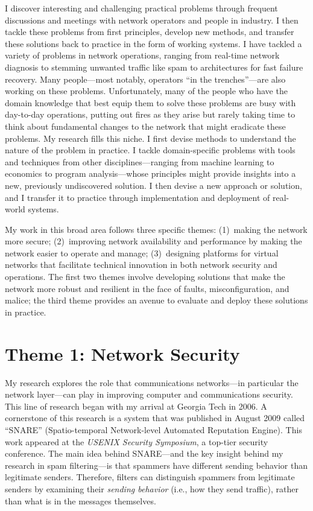 I discover interesting and challenging practical problems through
frequent discussions and meetings with network operators and people in
industry.  I then tackle these problems from first principles, develop
new methods, and transfer these solutions back to practice in the form
of working systems.  I have tackled a variety of problems in network
operations, ranging from real-time network diagnosis to stemming
unwanted traffic like spam to architectures for fast failure recovery.
Many people---most notably, operators ``in the trenches''---are also
working on these problems.  Unfortunately, many of the people who have
the domain knowledge that best equip them to solve these problems are
busy with day-to-day operations, putting out fires as they arise but
rarely taking time to think about fundamental changes to the network
that might eradicate these problems.  My research fills this niche.  I
first devise methods to understand the nature of the problem in
practice.  I tackle domain-specific problems with tools and techniques
from other disciplines---ranging from machine learning to economics to
program analysis---whose principles might provide insights into a new,
previously undiscovered solution.  I then devise a new approach or
solution, and I transfer it to practice through implementation and
deployment of real-world systems.

My work in this broad area follows three specific themes: (1)~making the
network more secure; (2)~improving network availability and performance
by making the network easier to operate and manage; (3)~designing
platforms for virtual networks that facilitate technical innovation in
both network security and operations.  The first two themes involve
developing solutions that make the network more robust and resilient in
the face of faults, misconfiguration, and malice; the third theme
provides an avenue to evaluate and deploy these solutions in practice.

\section*{Theme 1: Network Security}

  My research explores the role that communications
networks---in particular the network layer---can play in improving
computer and communications security.  This line of research began with
my arrival at Georgia Tech in 2006. A cornerstone of this
research is a system that was published in August 2009 called ``SNARE''
(Spatio-temporal Network-level Automated Reputation Engine). This work
appeared at the {\em USENIX Security Symposium}, a top-tier security
conference. The main idea behind SNARE---and the key insight behind my
research in spam filtering---is that spammers have different sending
behavior than legitimate senders.  Therefore, filters can distinguish
spammers from legitimate senders by examining their {\em sending
behavior} (i.e., how they send traffic), rather than what is in the
messages themselves.


